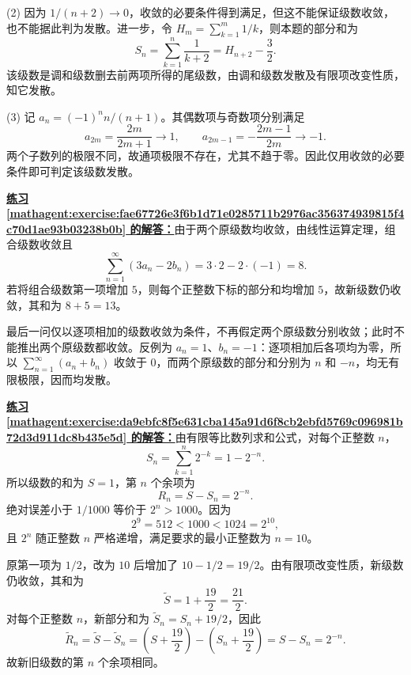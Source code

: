 \documentclass[UTF8,fontset=fandol,11pt]{ctexart}
\begin{document}
(2) 因为 $1/(n+2)\to0$，收敛的必要条件得到满足，但这不能保证级数收敛，也不能据此判为发散。进一步，令 $H_m=\sum_{k=1}^{m}1/k$，则本题的部分和为
\[
S_n=\sum_{k=1}^{n}\frac1{k+2}=H_{n+2}-\frac32.
\]
该级数是调和级数删去前两项所得的尾级数，由调和级数发散及有限项改变性质，知它发散。

(3) 记 $a_n=(-1)^n n/(n+1)$。其偶数项与奇数项分别满足
\[
a_{2m}=\frac{2m}{2m+1}\longrightarrow1,\qquad
a_{2m-1}=-\frac{2m-1}{2m}\longrightarrow-1.
\]
两个子数列的极限不同，故通项极限不存在，尤其不趋于零。因此仅用收敛的必要条件即可判定该级数发散。\par
\par\noindent\textbf{\hyperref[mathagent:exercise:fae67726e3f6b1d71e0285711b2976ac356374939815f4c70d1ae93b03238b0b]{练习 \ref*{mathagent:exercise:fae67726e3f6b1d71e0285711b2976ac356374939815f4c70d1ae93b03238b0b} 的解答：}}由于两个原级数均收敛，由线性运算定理，组合级数收敛且
\[
\sum_{n=1}^{\infty}(3a_n-2b_n)=3\cdot2-2\cdot(-1)=8.
\]
若将组合级数第一项增加 $5$，则每个正整数下标的部分和均增加 $5$，故新级数仍收敛，其和为 $8+5=13$。

最后一问仅以逐项相加的级数收敛为条件，不再假定两个原级数分别收敛；此时不能推出两个原级数都收敛。反例为 $a_n=1$、$b_n=-1$：逐项相加后各项均为零，所以 $\sum_{n=1}^{\infty}(a_n+b_n)$ 收敛于 $0$，而两个原级数的部分和分别为 $n$ 和 $-n$，均无有限极限，因而均发散。\par
\par\noindent\textbf{\hyperref[mathagent:exercise:da9ebfc8f5e631cba145a91d6f8cb2ebfd5769c096981b72d3d911dc8b435e5d]{练习 \ref*{mathagent:exercise:da9ebfc8f5e631cba145a91d6f8cb2ebfd5769c096981b72d3d911dc8b435e5d} 的解答：}}由有限等比数列求和公式，对每个正整数 $n$，
\[
S_n=\sum_{k=1}^{n}2^{-k}=1-2^{-n}.
\]
所以级数的和为 $S=1$，第 $n$ 个余项为
\[
R_n=S-S_n=2^{-n}.
\]
绝对误差小于 $1/1000$ 等价于 $2^n>1000$。因为
\[
2^9=512<1000<1024=2^{10},
\]
且 $2^n$ 随正整数 $n$ 严格递增，满足要求的最小正整数为 $n=10$。

原第一项为 $1/2$，改为 $10$ 后增加了 $10-1/2=19/2$。由有限项改变性质，新级数仍收敛，其和为
\[
\widetilde S=1+\frac{19}{2}=\frac{21}{2}.
\]
对每个正整数 $n$，新部分和为 $\widetilde S_n=S_n+19/2$，因此
\[
\widetilde R_n=\widetilde S-\widetilde S_n
=\left(S+\frac{19}{2}\right)-\left(S_n+\frac{19}{2}\right)
=S-S_n=2^{-n}.
\]
故新旧级数的第 $n$ 个余项相同。\par
\end{document}
